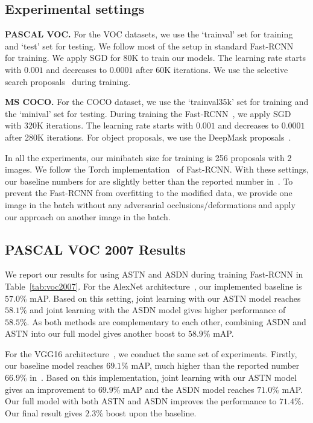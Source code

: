 \documentclass[10pt,twocolumn,letterpaper]{article}
\begin{document}
\subsection{Experimental settings}

\textbf{PASCAL VOC.} For the VOC datasets, we use the `trainval' set for training and `test' set for testing.  We follow most of the setup in standard Fast-RCNN~\cite{frcn} for training. We apply SGD for 80K to train our models. The learning rate starts with $0.001$ and decreases to $0.0001$ after 60K iterations. We use the selective search proposals~\cite{Uijlings13} during training. 

\textbf{MS COCO.} For the COCO dataset, we use the `trainval35k' set for training and the  `minival' set for testing. During training the Fast-RCNN~\cite{frcn}, we apply SGD with 320K iterations. The learning rate starts with $0.001$ and decreases to $0.0001$ after 280K iterations. For object proposals, we use the DeepMask proposals~\cite{DeepMask}. 

In all the experiments, our minibatch size for training is 256 proposals with 2 images. We follow the Torch implementation~\cite{Zagoruyko2016Multipath} of Fast-RCNN. With these settings, our baseline numbers for are slightly better than the reported number in~\cite{frcn}. To prevent the Fast-RCNN from overfitting to the modified data, we provide one image in the batch without any adversarial occlusions/deformations and apply our approach on another image in the batch. 


\subsection{PASCAL VOC 2007 Results}
\vspace{-0.05in}
We report our results for using ASTN and ASDN during training Fast-RCNN in Table~\ref{tab:voc2007}. For the AlexNet architecture~\cite{alex}, our implemented baseline is $57.0\%$ mAP. Based on this setting, joint learning with our ASTN model reaches $58.1\%$ and joint learning with the ASDN model gives higher performance of $58.5\%$. As both methods are complementary to each other, combining ASDN and ASTN into our full model gives another boost to $58.9\%$ mAP. 

For the VGG16 architecture~\cite{VGG}, we conduct the same set of experiments. Firstly, our baseline model reaches $69.1\%$ mAP, much higher than the reported number $66.9\%$ in~\cite{frcn}. Based on this implementation, joint learning with our ASTN model gives an improvement to $69.9\%$ mAP and the ASDN model reaches $71.0\%$ mAP. Our full model with both ASTN and ASDN improves the performance to $71.4\%$. Our final result gives  $2.3\%$ boost upon the baseline. 
\end{document}
